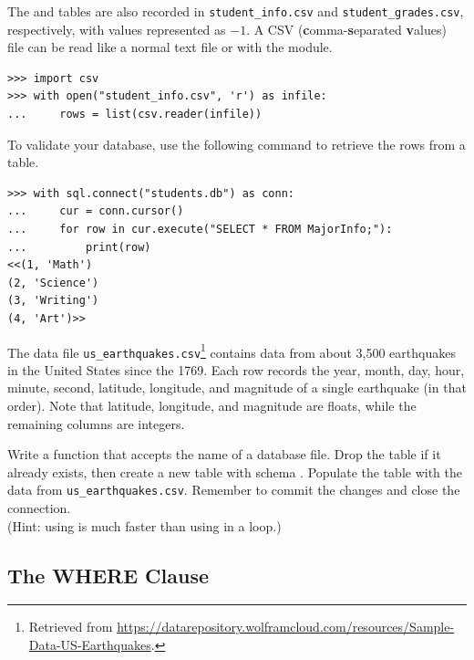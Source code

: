 \begin{problem}
The  and  tables are also recorded in \texttt{student\_info.csv} and \texttt{student\_grades.csv}, respectively, with  values represented as $-1$.
A CSV (\textbf{c}omma-\textbf{s}eparated \textbf{v}alues) file can be read like a normal text file or with the  module.

\begin{lstlisting}
>>> import csv
>>> with open("student_info.csv", 'r') as infile:
...     rows = list(csv.reader(infile))
\end{lstlisting}

To validate your database, use the following command to retrieve the rows from a table.

\begin{lstlisting}
>>> with sql.connect("students.db") as conn:
...     cur = conn.cursor()
...     for row in cur.execute("SELECT * FROM MajorInfo;"):
...         print(row)
<<(1, 'Math')
(2, 'Science')
(3, 'Writing')
(4, 'Art')>>
\end{lstlisting}
\label{prob:sql1-populate-students}
\end{problem}

\begin{problem}
The data file \texttt{us\_earthquakes.csv}\footnote{Retrieved from \url{https://datarepository.wolframcloud.com/resources/Sample-Data-US-Earthquakes}.} contains data from about 3,500 earthquakes in the United States since the 1769.
Each row records the year, month, day, hour, minute, second, latitude, longitude, and magnitude of a single earthquake (in that order).
Note that latitude, longitude, and magnitude are floats, while the remaining columns are integers.

Write a function that accepts the name of a database file.
Drop the table  if it already exists, then create a new  table with schema .
Populate the table with the data from \texttt{us\_earthquakes.csv}.
Remember to commit the changes and close the connection.
\\ (Hint: using  is much faster than using  in a loop.)
\label{prob:sql1-create-earthquakes}
\end{problem}

\subsection*{The WHERE Clause} %

